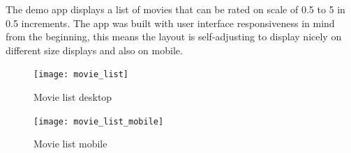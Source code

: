 The demo app displays a list of movies that can be rated on scale of 0.5 to 5 in 0.5 increments. The app was built with user interface responsiveness in mind from the beginning, this means the layout is self-adjusting to display nicely on different size displays and also on mobile.

\begin{figure}[h!]
    \texttt{[image: movie\_list]}
    \caption{Movie list desktop}
    \label{movie_list}
\end{figure}

\begin{figure}[h!]
    \texttt{[image: movie\_list\_mobile]}
    \caption{Movie list mobile}
    \label{movie_list}
\end{figure}